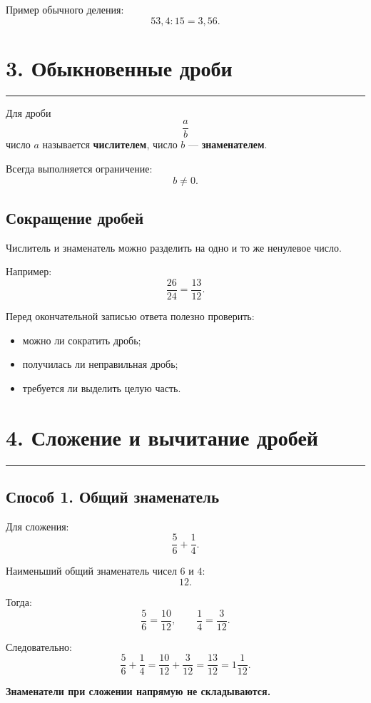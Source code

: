 \documentclass[a4paper,12pt]{article}
\newcommand{\sectionline}{%
    \vspace{-0.25em}
    {\color{accent}\rule{\linewidth}{0.7pt}}
    \vspace{0.3em}
}
\newcommand{\checkitem}{\item[\textcolor{accent}{$\checkmark$}]}
\newcommand{\important}[1]{\textcolor{darkaccent}{\textbf{#1}}}
\begin{document}
Пример обычного деления:
\[
53{,}4:15=3{,}56.
\]


\section*{\color{darkaccent}3. Обыкновенные дроби}
\sectionline

Для дроби
\[
\frac{a}{b}
\]
число \(a\) называется \textbf{числителем}, число \(b\) ---
\textbf{знаменателем}.

Всегда выполняется ограничение:
\[
\boxed{b\ne0}.
\]

\subsection*{\color{accent}Сокращение дробей}

Числитель и знаменатель можно разделить на одно и то же ненулевое число.

Например:
\[
\frac{26}{24}
=
\frac{13}{12}.
\]

Перед окончательной записью ответа полезно проверить:

\begin{itemize}
    \checkitem можно ли сократить дробь;
    \checkitem получилась ли неправильная дробь;
    \checkitem требуется ли выделить целую часть.
\end{itemize}


\section*{\color{darkaccent}4. Сложение и вычитание дробей}
\sectionline

\subsection*{\color{accent}Способ 1. Общий знаменатель}

Для сложения:
\[
\frac{5}{6}+\frac14.
\]

Наименьший общий знаменатель чисел \(6\) и \(4\):
\[
12.
\]

Тогда:
\[
\frac56=\frac{10}{12},
\qquad
\frac14=\frac3{12}.
\]

Следовательно:
\[
\frac56+\frac14
=
\frac{10}{12}+\frac3{12}
=
\frac{13}{12}
=
1\frac1{12}.
\]

\important{Знаменатели при сложении напрямую не складываются.}
\end{document}
